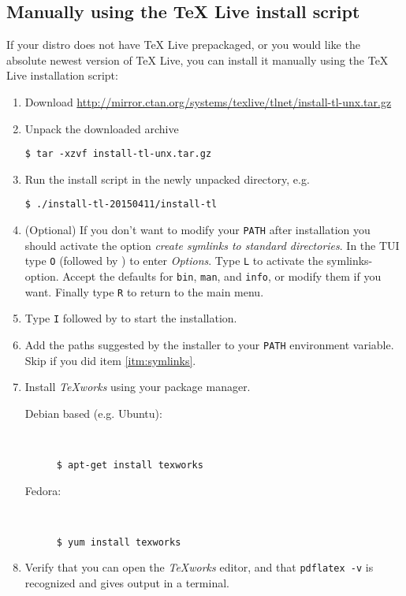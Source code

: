 \documentclass[a4paper, 12pt]{article}
\begin{document}
\subsection{Manually using the TeX Live install script}
If your distro does not have TeX Live prepackaged, or you would like the absolute newest version of TeX Live, you can install it manually using the TeX Live installation script:
\begin{enumerate}
	\item Download \url{http://mirror.ctan.org/systems/texlive/tlnet/install-tl-unx.tar.gz}
	\item Unpack the downloaded archive
\begin{lstlisting}
$ tar -xzvf install-tl-unx.tar.gz
\end{lstlisting}	

	\item Run the install script in the newly unpacked directory, e.g.
\begin{lstlisting} 
$ ./install-tl-20150411/install-tl
\end{lstlisting}

	\item \label{itm:symlinks} (Optional) If you don't want to modify your \verb!PATH! after installation you should activate the option \emph{create symlinks to standard directories}. In the TUI type \verb!O! (followed by \keys{\return}) to enter \emph{Options}. Type \verb!L! to activate the symlinks-option. Accept the defaults for \verb!bin!, \verb!man!, and \verb!info!, or modify them if you want. Finally type \verb!R! to return to the main menu.
	
	\item Type \verb!I! followed by \keys{\return} to start the installation.
	
	\item Add the paths suggested by the installer to your \verb!PATH! environment variable. Skip if you did item \ref{itm:symlinks}.


	\item Install \emph{TeXworks} using your package manager. 
		\begin{description}
			\item[Debian based (e.g. Ubuntu):] \hfill \\ 
\begin{lstlisting}
$ apt-get install texworks
\end{lstlisting}
	
			\item[Fedora:] \hfill \\
\begin{lstlisting}
$ yum install texworks
\end{lstlisting}	
		\end{description}
		
	\item Verify that you can open the \emph{TeXworks} editor, and that \lstinline|pdflatex -v| is recognized and gives output in a terminal.		
\end{enumerate}
\end{document}
